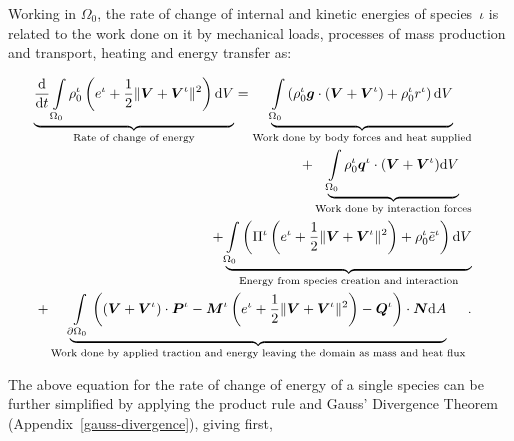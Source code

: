 Working in $\Omega_0$, the rate of change of internal and kinetic
energies of species~$\iota$ is related to the work done on it by
mechanical loads, processes of mass production and transport, heating
and energy transfer as:

\begin{eqnarray}
\underbrace{\frac{\mathrm{d}}{\mathrm{d}t}
  \int\limits_{\Omega_0}\rho_0^\iota \left ( e^\iota + \frac{1}{2}
  \Vert\mbox{\boldmath$ V$}+\mbox{\boldmath$ V$}^\iota\Vert^2 \right ) \mathrm{d}V}_{\text{Rate of
    change of energy}} = \underbrace{\int\limits_{\Omega_0}
  \left(\rho_0^\iota\mbox{\boldmath$ g$} \cdot\left(\mbox{\boldmath$ V$}+\mbox{\boldmath$ V$}^\iota\right) + \rho_0^\iota
  r^\iota \right)\mathrm{d}V}_{\text{Work done by body forces and heat
    supplied}}& &\nonumber\\ +\underbrace{\int\limits_{\Omega_0}
  \rho_0^\iota\mbox{\boldmath$ q$}^\iota\cdot(\mbox{\boldmath$ V$} + \mbox{\boldmath$ V$}^\iota) \mathrm{d}V}_{\text{Work
    done by interaction forces}}& &\nonumber\\ +
\underbrace{\int\limits_{\Omega_0} \left(\Pi^\iota\left(e^\iota +
  \frac{1}{2}\Vert\mbox{\boldmath$ V$}+\mbox{\boldmath$ V$}^\iota\Vert^2\right) +
  \rho^\iota_0\tilde{e}^\iota\right)\mathrm{d}V}_{\text{Energy from
    species creation and interaction}} & & \nonumber \\ +
\underbrace{\int\limits_{\partial \Omega_0}
  \left(\left(\mbox{\boldmath$ V$}+\mbox{\boldmath$ V$}^\iota\right)\cdot\mbox{\boldmath$ P$}^\iota -
  \mbox{\boldmath$ M$}^\iota\left(e^\iota +\frac{1}{2} \Vert\mbox{\boldmath$ V$}+\mbox{\boldmath$ V$}^\iota\Vert^2\right)
  - \mbox{\boldmath$ Q$}^\iota\right)\cdot\mbox{\boldmath$ N$}\mathrm{d}A}_{\text{Work done by applied
    traction and energy leaving the domain as mass and heat flux}}.
\label{globalbalanceofenergy}
\end{eqnarray}

The above equation for the rate of change of energy of a single
species can be further simplified by applying the product rule and
Gauss' Divergence Theorem (Appendix~\ref{gauss-divergence}), giving
first,

